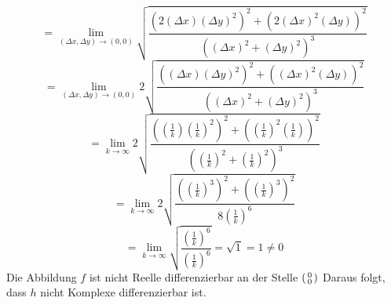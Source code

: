 \documentclass{scrartcl}
\begin{document}
\[=\lim_{(\Delta x,\Delta y)\rightarrow(0,0)}\sqrt{\frac{\left(2 (\Delta x) (\Delta y)^2\right)^2+\left(2 (\Delta x)^2 (\Delta y)\right)^2}{\left((\Delta x)^2+(\Delta y)^2\right)^3}}\]
\[=\lim_{(\Delta x,\Delta y)\rightarrow(0,0)}2 \sqrt{\frac{\left((\Delta x) (\Delta y)^2\right)^2+\left((\Delta x)^2 (\Delta y)\right)^2}{\left((\Delta x)^2+(\Delta y)^2\right)^3}}\]
\[=\lim_{k\rightarrow \infty }2 \sqrt{\frac{\left((\frac{1}{k}) (\frac{1}{k})^2\right)^2+\left((\frac{1}{k})^2 (\frac{1}{k})\right)^2}{\left((\frac{1}{k})^2+(\frac{1}{k})^2\right)^3}}\]
\[=\lim_{k\rightarrow \infty }2 \sqrt{\frac{\left((\frac{1}{k})^3\right)^2+\left((\frac{1}{k})^3 \right)^2}{8(\frac{1}{k})^6}}\]
\[=\lim_{k\rightarrow \infty } \sqrt{\frac{(\frac{1}{k})^6}{(\frac{1}{k})^6}}=\sqrt{1}=1\neq0\]
Die Abbildung $f$ ist nicht Reelle differenzierbar an der Stelle \(\begin{psmallmatrix}0\\0\end{psmallmatrix}\)
Daraus folgt, dass $h$ nicht Komplexe differenzierbar ist.
\end{document}

